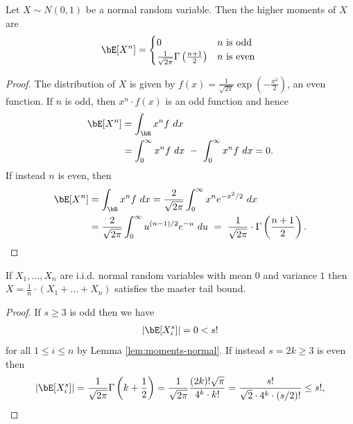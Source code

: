 \begin{homework}[e]
\begin{prf}
    \begin{lem}\label{lem:moments-normal}
      Let $X \sim N(0,1)$ be a normal random variable. Then the higher moments of $X$ are
      \begin{align*}
        \bE[X^n] =
        \begin{cases}
          0 & n \text{ is odd } \\
          \frac{1}{\sqrt{2\pi}} \Gamma\left(\frac{n+1}{2}\right) & n\text{ is even }
        \end{cases}
      \end{align*}
    \end{lem}
    \begin{proof}
      The distribution of $X$ is given by $f(x) = \frac{1}{\sqrt{2\pi}} \exp\left(-\frac{x^2}{2}\right)$, an even function. If $n$ is odd, then $x^n \cdot f(x)$ is an odd function and hence
      \begin{align*}
        \bE[X^n] &= \int_\bR x^n f ~dx \\
                 &= \int_{0}^\infty x^n f ~dx ~-~ \int_{0}^\infty x^n f ~dx = 0.
      \end{align*}
      If instead $n$ is even, then
      \begin{align*}
        \bE[X^n] &= \int_\bR x^n f ~dx
                 = \frac{2}{\sqrt{2\pi}}\int_{0}^\infty x^n e^{-x^2/2} ~dx \\
                 &= \frac{2}{\sqrt{2\pi}}\int_0^\infty u^{(n-1)/2}e^{-u}~du ~=~ \frac{1}{\sqrt{2\pi}} \cdot \Gamma\left(\frac{n+1}{2}\right).
      \end{align*}
    \end{proof}
    \begin{cor}\label{cor:normal-mtb}
      If $X_1,...,X_n$ are i.i.d. normal random variables with mean $0$ and variance $1$ then $X = \frac{1}{n}\cdot(X_1 + ... + X_n)$ satisfies the master tail bound.
    \end{cor}
    \begin{proof}
      If $s \geq 3$ is odd then we have
      \begin{align*}
        |\bE[X_i^s]| = 0 < s!
      \end{align*}
      for all $1\leq i\leq n$ by Lemma \ref{lem:moments-normal}. If instead $s = 2k \geq 3$ is even then
      \begin{align*}
        |\bE[X_i^s]| = \frac{1}{\sqrt{2\pi}} \Gamma\left(k+ \frac{1}{2}\right) = \frac{1}{\sqrt{2\pi}} \frac{(2k)!\sqrt{\pi}}{4^k\cdot k!} = \frac{s!}{\sqrt{2}\cdot 4^k \cdot (s/2)!} \leq s!,
      \end{align*}

\end{proof}
\end{prf}
\end{homework}
